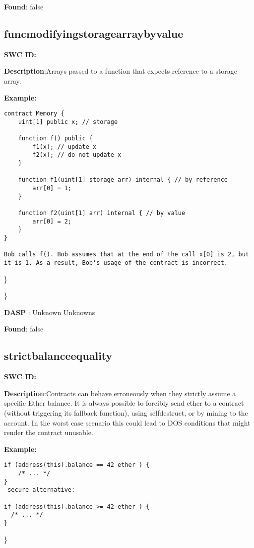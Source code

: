 \documentclass{article}
\begin{document}
\textbf{Found}: false

\subsection{func\textunderscore modifying\textunderscore storage\textunderscore array\textunderscore by\textunderscore value} 
\textbf{SWC \textunderscore ID:} 

\textbf{Description}:Arrays passed to a function that expects reference to a storage array.


\textbf{Example:} 
\begin{verbatim}
contract Memory {
    uint[1] public x; // storage

    function f() public {
        f1(x); // update x
        f2(x); // do not update x
    }

    function f1(uint[1] storage arr) internal { // by reference
        arr[0] = 1;
    }

    function f2(uint[1] arr) internal { // by value
        arr[0] = 2;
    }
}

Bob calls f(). Bob assumes that at the end of the call x[0] is 2, but it is 1. As a result, Bob's usage of the contract is incorrect.

\end{verbatim}\} 

\} 

\textbf{DASP} : Unknown Unknowns

\textbf{Found}: false

\subsection{strict\textunderscore balance\textunderscore equality} 
\textbf{SWC \textunderscore ID:} 

\textbf{Description}:Contracts can behave erroneously when they strictly assume a specific Ether balance. It is always possible to forcibly send ether to a contract (without triggering its fallback function), using selfdestruct, or by mining to the account. In the worst case scenario this could lead to DOS conditions that might render the contract unusable.


\textbf{Example:} 
\begin{verbatim}
if (address(this).balance == 42 ether ) {
    /* ... */
}
 secure alternative:

if (address(this).balance >= 42 ether ) {
  /* ... */
}

\end{verbatim}\} 
\end{document}
